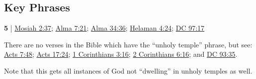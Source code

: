 	
		
		
\subsection{Key Phrases} %
	\label{TEMPLE-PHRASES}

	\begin{compactdesc}
	
		\item[unholy temple] \textbf{5} | \hyperref[MOSIAH-2-37]{Mosiah 2:37}; \hyperref[ALMA-7-21]{Alma 7:21}; \hyperref[ALMA-34-36]{Alma 34:36}; \hyperref[HELAMAN-4-24]{Helaman 4:24}; \hyperref[DC97-17]{DC 97:17}
			\begin{compactdesc}
				\item[Bible anchor verses] There are no verses in the Bible which have the ``unholy temple'' phrase, but see: \hyperref[ACTS-7-48]{Acts 7:48}; \hyperref[ACTS-17-24]{Acts 17:24}; \hyperref[1CORINTHIANS-3-16]{1 Corinthians 3:16}; \hyperref[2CORINTHIANS-6-16]{2 Corinthians 6:16}; and \hyperref[DC93-35]{DC 93:35}.
				\item[Commentary] Note that this gets all instances of God not ``dwelling'' in unholy temples as well.
			\end{compactdesc}
			
			
	\end{compactdesc}
	
